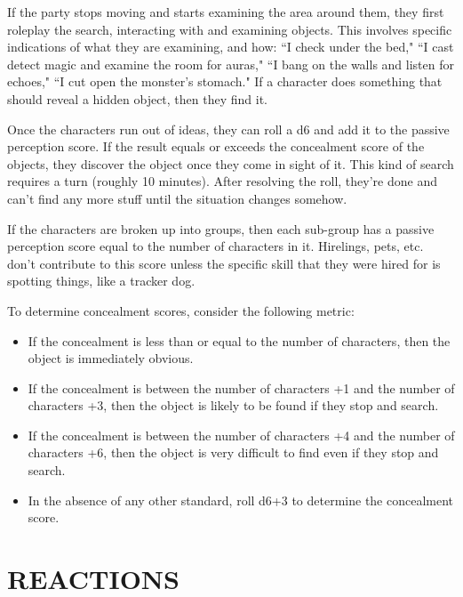 \documentclass[twoside]{article}
\begin{document}
\bigbreak

If the party stops moving and starts examining the area around them, they first roleplay the search, interacting with and examining objects. This involves specific indications of what they are examining, and how: ``I check under the bed," ``I cast detect magic and examine the room for auras," ``I bang on the walls and listen for echoes," ``I cut open the monster's stomach." If a character does something that should reveal a hidden object, then they find it.

\bigbreak

Once the characters run out of ideas, they can roll a d6 and add it to the passive perception score. If the result equals or exceeds the concealment score of the objects, they discover the object once they come in sight of it. This kind of search requires a turn (roughly 10 minutes). After resolving the roll, they're done and can't find any more stuff until the situation changes somehow.

\bigbreak

If the characters are broken up into groups, then each sub-group has a passive perception score equal to the number of characters in it. Hirelings, pets, etc. don't contribute to this score unless the specific skill that they were hired for is spotting things, like a tracker dog.

\bigbreak

To determine concealment scores, consider the following metric:

\begin{itemize}[nosep]
\item If the concealment is less than or equal to the number of characters, then the object is immediately obvious.
\item If the concealment is between the number of characters +1 and the number of characters +3, then the object is likely to be found if they stop and search.
\item If the concealment is between the number of characters +4 and the number of characters +6, then the object is very difficult to find even if they stop and search.
\item In the absence of any other standard, roll d6+3 to determine the concealment score.
\end{itemize}

\section*{REACTIONS}
\end{document}

